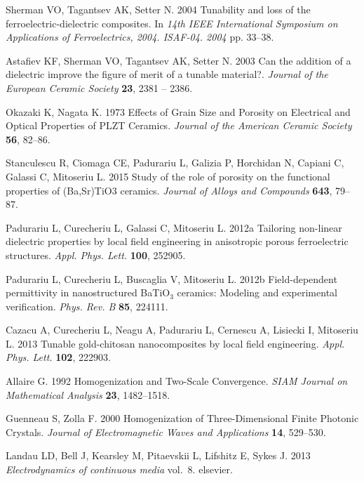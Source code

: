 \documentclass[%
 aip,
 amsmath,amssymb,
 reprint,%
linenumbers
]{revtex4-1}
\begin{document}
\begin{thebibliography}{99}
Sherman VO, Tagantsev AK, Setter N. 2004  Tunability and loss of the
  ferroelectric-dielectric composites. In {\em 14th {IEEE} {International}
  {Symposium} on {Applications} of {Ferroelectrics}, 2004. {ISAF}-04. 2004} pp.
  33--38.

Astafiev KF, Sherman VO, Tagantsev AK, Setter N. 2003  Can the addition of a
  dielectric improve the figure of merit of a tunable material?. {\em Journal
  of the European Ceramic Society} \textbf{23}, 2381 -- 2386.

Okazaki K, Nagata K. 1973  Effects of {Grain} {Size} and {Porosity} on
  {Electrical} and {Optical} {Properties} of {PLZT} {Ceramics}. {\em Journal of
  the American Ceramic Society} \textbf{56}, 82--86.

Stanculescu R, Ciomaga CE, Padurariu L, Galizia P, Horchidan N, Capiani C,
  Galassi C, Mitoseriu L. 2015  Study of the role of porosity on the functional
  properties of ({Ba},{Sr}){TiO}3 ceramics. {\em Journal of Alloys and
  Compounds} \textbf{643}, 79--87.

Padurariu L, Curecheriu L, Galassi C, Mitoseriu L. 2012a  Tailoring non-linear
  dielectric properties by local field engineering in anisotropic porous
  ferroelectric structures. {\em Appl. Phys. Lett.} \textbf{100}, 252905.

Padurariu L, Curecheriu L, Buscaglia V, Mitoseriu L. 2012b  Field-dependent
  permittivity in nanostructured {BaTiO}$_3$ ceramics: {Modeling} and
  experimental verification. {\em Phys. Rev. B} \textbf{85}, 224111.

Cazacu A, Curecheriu L, Neagu A, Padurariu L, Cernescu A, Lisiecki I, Mitoseriu
  L. 2013  Tunable gold-chitosan nanocomposites by local field engineering.
  {\em Appl. Phys. Lett.} \textbf{102}, 222903.

Allaire G. 1992  Homogenization and {Two}-{Scale} {Convergence}. {\em SIAM
  Journal on Mathematical Analysis} \textbf{23}, 1482--1518.

Guenneau S, Zolla F. 2000  Homogenization of {Three}-{Dimensional} {Finite}
  {Photonic} {Crystals}. {\em Journal of Electromagnetic Waves and
  Applications} \textbf{14}, 529--530.

Landau LD, Bell J, Kearsley M, Pitaevskii L, Lifshitz E, Sykes J. 2013 {\em
  Electrodynamics of continuous media} vol.~8.
elsevier.


\end{thebibliography}
\end{document}
